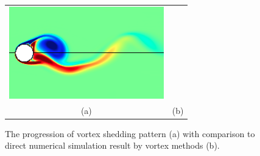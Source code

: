 \begin{figure}
\begin{center}
\begin{tabular}{cc}
 \includegraphics[height=4cm]{./Figures/results/rotating/T_11.png}  \\
 (a) & (b) \\
 \end{tabular}
\end{center}
 \caption[Vortex shedding pattern around a sinusoidally rotating cylinder]{The progression of vortex shedding pattern (a) with comparison to direct numerical simulation result by vortex methods (b). }
 \label{fig:RotatingWake1}
\end{figure}

